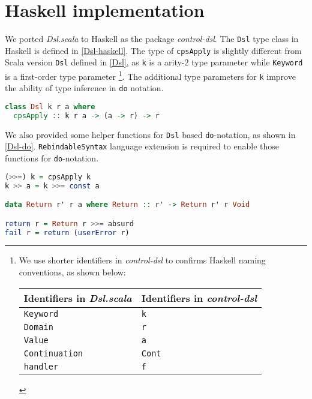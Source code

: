 \section{Haskell implementation}\label{Haskell implementation}

We ported \textit{Dsl.scala} to Haskell as the package \textit{control-dsl}. The \lstinline{Dsl} type class in Haskell is defined in \cref{Dsl-haskell}. The type of \lstinline{cpsApply} is slightly different from Scala version \lstinline{Dsl} defined in \cref{Dsl}, as \lstinline{k} is a arity-2 type parameter while \lstinline{Keyword} is a first-order type parameter \footnote{
  We use shorter identifiers in \textit{control-dsl} to confirms Haskell naming conventions, as shown below:
  
  \begin{tabular}{l|l}
    Identifiers in \textit{Dsl.scala} & Identifiers in \textit{control-dsl} \\
    \hline
    \texttt{Keyword} & \texttt{k} \\
    \texttt{Domain} & \texttt{r} \\
    \texttt{Value} & \texttt{a} \\
    \texttt{Continuation} & \texttt{Cont} \\
    \texttt{handler} & \texttt{f} \\
  \end{tabular}
}. The additional type parameters for \lstinline{k} improve the ability of type inference in \lstinline{do} notation.

\begin{lstlisting}[float=htbp,language={Haskell},caption={\lstinline{Dsl} type class in \textit{control-dsl}},label={Dsl-haskell}]
class Dsl k r a where
  cpsApply :: k r a -> (a -> r) -> r
\end{lstlisting}

We also provided some helper functions for \lstinline{Dsl} based \lstinline{do}-notation, as shown in \cref{Dsl-do}. \lstinline{RebindableSyntax} language extension is required to enable those functions for \lstinline{do}-notation.

\begin{lstlisting}[float=htbp,language={Haskell},caption={Helpers for \lstinline{Dsl} based \lstinline{do}-notation},label={Dsl-do}]
(>>=) k = cpsApply k
k >> a = k >>= const a

data Return r' r a where Return :: r' -> Return r' r Void

return r = Return r >>= absurd
fail r = return (userError r)
\end{lstlisting}


